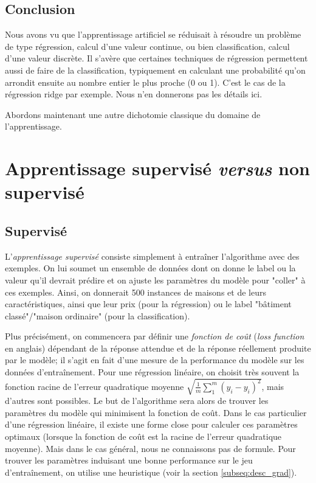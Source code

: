 \subsection*{Conclusion}
Nous avons vu que l'apprentissage artificiel se réduisait à résoudre un problème de type régression, calcul d'une valeur continue, ou bien classification, calcul d'une valeur discrète. Il s'avère que certaines techniques de régression permettent aussi de faire de la classification, typiquement en calculant une probabilité qu'on arrondit ensuite au nombre entier le plus proche (0 ou 1). C'est le cas de la régression ridge par exemple. Nous n'en donnerons pas les détails ici.

Abordons maintenant une autre dichotomie classique du domaine de l'apprentissage.

\section{Apprentissage supervisé \textit{versus} non supervisé}
\subsection{Supervisé}
L'\emph{apprentissage supervisé} consiste simplement à entraîner l'algorithme avec des exemples. On lui soumet un ensemble de données dont on donne le label ou la valeur qu'il devrait prédire et on ajuste les paramètres du modèle pour "coller" à ces exemples. Ainsi, on donnerait 500 instances de maisons et de leurs caractéristiques, ainsi que leur prix (pour la régression) ou le label "bâtiment classé"/"maison ordinaire" (pour la classification).

Plus précisément, on commencera par définir une \emph{fonction de coût} (\emph{loss function} en anglais) dépendant de la réponse attendue et de la réponse réellement produite par le modèle; il s'agit en fait d'une mesure de la performance du modèle sur les données d'entraînement. Pour une régression linéaire, on choisit très souvent la fonction racine de l'erreur quadratique moyenne \(\sqrt{\frac{1}{m}\sum_1^m(\hat y_i - y_i)^2}\), mais d'autres sont possibles. Le but de l'algorithme sera alors de trouver les paramètres du modèle qui minimisent la fonction de coût. Dans le cas particulier d'une régression linéaire, il existe une forme close pour calculer ces paramètres optimaux (lorsque la fonction de coût est la racine de l'erreur quadratique moyenne). Mais dans le cas général, nous ne connaissons pas de formule. Pour trouver les paramètres induisant une bonne performance sur le jeu d'entraînement, on utilise une heuristique (voir la section \ref{subseq:desc_grad}).


